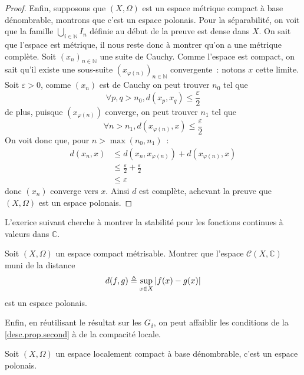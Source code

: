 \begin{proof}
  Enfin, supposons que $(X,\Omega)$ est un espace métrique compact à base
  dénombrable, montrons que c'est un espace polonais. Pour la séparabilité,
  on voit que la famille $\bigcup_{i \in \mathbb N} I_n$ définie au début de la
  preuve est dense dans $X$. On sait que l'espace est métrique, il nous reste
  donc à montrer qu'on a une métrique complète. Soit $(x_n)_{n\in\mathbb N}$
  une suite de Cauchy. Comme l'espace est compact, on sait qu'il existe une
  sous-suite $(x_{\varphi(n)})_{n\in\mathbb N}$ convergente~: notons $x$ cette
  limite. Soit $\varepsilon > 0$, comme $(x_n)$ est de Cauchy on peut trouver
  $n_0$ tel que
  \[\forall p,q > n_0, d(x_p,x_q) \leq \frac{\varepsilon}{2}\]
  de plus, puisque $(x_{\varphi(n)})$ converge, on peut trouver $n_1$ tel que
  \[\forall n > n_1, d(x_{\varphi(n)},x) \leq \frac{\varepsilon}{2}\]
  On voit donc que, pour $n > \max(n_0,n_1)$~:
  \begin{align*}
    d(x_n,x) &\leq d(x_n,x_{\varphi(n)}) + d(x_{\varphi(n)},x)\\
    &\leq \frac{\varepsilon}{2} + \frac{\varepsilon}{2}\\
    &\leq\varepsilon
  \end{align*}
  donc $(x_n)$ converge vers $x$. Ainsi $d$ est complète, achevant la preuve
  que $(X,\Omega)$ est un espace polonais.
\end{proof}

L'exerice suivant cherche à montrer la stabilité pour les fonctions continues à
valeurs dans $\mathbb C$.

\begin{exercise}
  Soit $(X,\Omega)$ un espace compact métrisable. Montrer que l'espace
  $\mathcal C(X,\mathbb C)$ muni de la distance
  \[d(f,g) \triangleq \sup_{x \in X}|f(x) - g(x)|\]
  est un espace polonais.
\end{exercise}

Enfin, en réutilisant le résultat sur les $G_\delta$, on peut affaiblir les
conditions de la \cref{desc.prop.second} à de la compacité locale.

\begin{proposition}
  Soit $(X,\Omega)$ un espace localement compact à base dénombrable, c'est un
  espace polonais.
\end{proposition}

